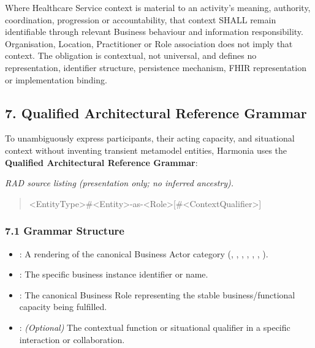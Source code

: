 Where Healthcare Service context is material to an activity's meaning, authority, coordination, progression or accountability, that context SHALL remain identifiable through relevant Business behaviour and information responsibility. Organisation, Location, Practitioner or Role association does not imply that context. The obligation is contextual, not universal, and defines no representation, identifier structure, persistence mechanism, FHIR representation or implementation binding.

\label{rad:metamodel:282}

\par\smallskip
{}\label{rad:metamodel:284}
\subsection*{7. Qualified Architectural Reference Grammar}
\label{rad:metamodel:286}

To unambiguously express participants, their acting capacity, and situational context without inventing transient metamodel entities, Harmonia uses the \textbf{Qualified Architectural Reference Grammar}:

\label{rad:metamodel:288}

\textit{RAD source listing (presentation only; no inferred ancestry).}
\begin{quote}
<EntityType>\#<Entity>-as-<Role>[\#<ContextQualifier>]
\end{quote}
\label{rad:metamodel:292}
\subsubsection*{7.1 Grammar Structure}
\label{rad:metamodel:293}

\begin{itemize}

\item 
\texttt{}: A rendering of the canonical Business Actor category (\texttt{}, \texttt{}, \texttt{}, \texttt{}, \texttt{}, \texttt{}, \texttt{}).



\item 
\texttt{}: The specific business instance identifier or name.



\item 
\texttt{}: The canonical Business Role representing the stable business/\allowbreak{}functional capacity being fulfilled.



\item 
\texttt{\seqsplit{[\#<ContextQualifier>]}}: \emph{(Optional)} The contextual function or situational qualifier in a specific interaction or collaboration.



\end{itemize}
\label{rad:metamodel:298}


